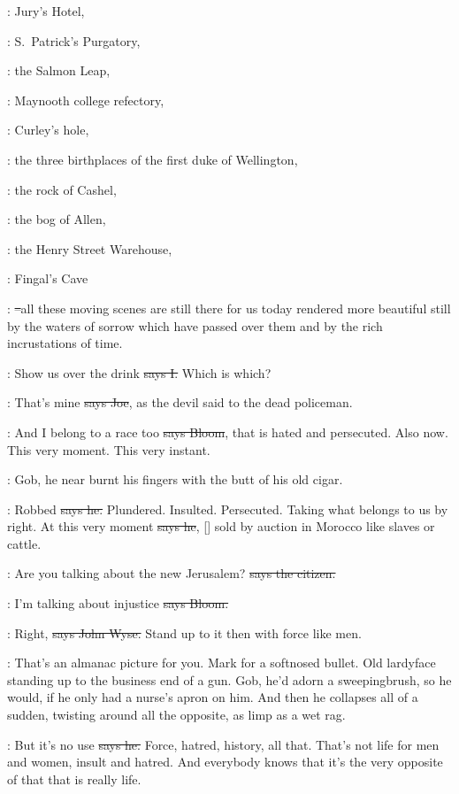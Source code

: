 :
Jury's Hotel,

:
S.~Patrick's Purgatory,

:
the Salmon Leap,

:
Maynooth college refectory,

:
Curley's hole,

:
the three birthplaces of the first duke of Wellington,

:
the rock of Cashel,

:
the bog of Allen,

:
the Henry Street Warehouse,

:
Fingal's Cave

:
\sout{--}all these moving scenes are still there for us
today rendered more beautiful still by the waters of sorrow which have
passed over them and by the rich incrustations of time.

:
Show us over the drink
\sout{says I.}
Which is which?

\joe:
That's mine
\sout{says Joe},
as the devil said to the dead policeman.

\Bloom:
And I belong to a race too
\sout{says Bloom},
that is hated and persecuted.
Also now.
This very moment.
This very instant.

\Nq:
Gob,
he near burnt his fingers with the butt of his old cigar.

\Bloom:
Robbed
\sout{says he.}
Plundered.
Insulted.
Persecuted.
Taking what belongs to us by right.
At this very moment
\sout{says he},
[]
sold by auction in Morocco like slaves or cattle.

\citizen:
Are you talking about the new Jerusalem?
\sout{says the citizen.}

\Bloom:
I'm talking about injustice
\sout{says Bloom.}

\johnwyse:
Right,
\sout{says John Wyse.}
Stand up to it then with force like men.

\Nq:
That's an almanac picture for you.
Mark for a softnosed bullet.
Old lardyface standing up to the business end of a gun.
Gob,
he'd adorn a sweepingbrush,
so he would,
if he only had a nurse's apron on him.
And then he collapses all of a sudden,
twisting around all the opposite,
as limp as a wet rag.%

\Bloom:
But it's no use
\sout{says he.}
Force,
hatred,
history,
all that.
That's not life for men and women,
insult and hatred.
And everybody knows that it's the very opposite of that that is really life.

